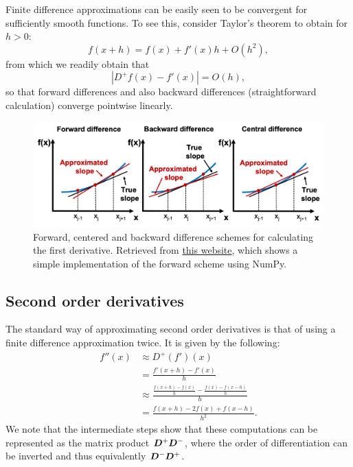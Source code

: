 \documentclass{article}
\newcommand{\mat}{\matrixsym}
\begin{document}
Finite difference approximations can be easily seen to be convergent for sufficiently smooth functions. To see this, consider Taylor's theorem to obtain for $h>0$:
    $$ f(x+ h) = f(x) + f'(x)h + O(h^2), $$
from which we readily obtain that 
    $$ | D^+f(x) - f'(x) | = O(h), $$
    so that forward differences and also backward differences (straightforward calculation) converge pointwise linearly. 

\begin{figure}
    \centering
    \includegraphics[width=\linewidth]{figuras/fdm_convergence.png}
    \caption{Forward, centered and backward difference schemes for calculating the first derivative. Retrieved from \href{https://pythonnumericalmethods.studentorg.berkeley.edu/notebooks/chapter20.02-Finite-Difference-Approximating-Derivatives.html}{this website}, which shows a simple implementation of the forward scheme using NumPy.}
\end{figure}

\subsection{Second order derivatives}
The standard way of approximating second order derivatives is that of using a finite difference approximation twice. It is given by the following: 
$$ \begin{aligned}
    f''(x) &\approx D^+(f')(x) \\
           &=\frac{f'(x+h) - f'(x)}{h} \\
           &\approx\frac{\frac{f(x+h) - f(x)}{h} - \frac{f(x) - f(x-h)}{h}}{h} \\
           &= \frac{f(x+h) - 2f(x) + f(x-h)}{h^2}.
    \end{aligned}
$$
We note that the intermediate steps show that these computations can be represented as the matrix product $\mat D^+ \mat D^-$, where the order of differentiation can be inverted and thus equivalently $\mat D^- \mat D^+$. 
\end{document}
